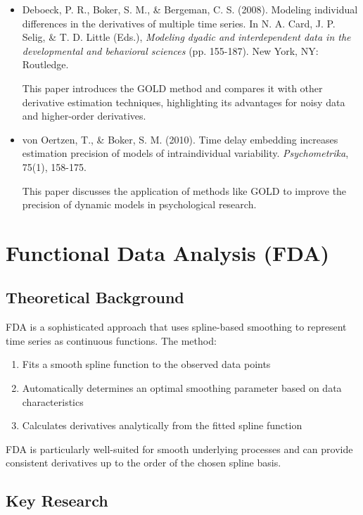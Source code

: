 \documentclass{article}
\begin{document}
\begin{itemize}
    \item Deboeck, P. R., Boker, S. M., \& Bergeman, C. S. (2008). Modeling individual differences in the derivatives of multiple time series. In N. A. Card, J. P. Selig, \& T. D. Little (Eds.), \textit{Modeling dyadic and interdependent data in the developmental and behavioral sciences} (pp. 155-187). New York, NY: Routledge.
    
    This paper introduces the GOLD method and compares it with other derivative estimation techniques, highlighting its advantages for noisy data and higher-order derivatives.
    
    \item von Oertzen, T., \& Boker, S. M. (2010). Time delay embedding increases estimation precision of models of intraindividual variability. \textit{Psychometrika}, 75(1), 158-175.
    
    This paper discusses the application of methods like GOLD to improve the precision of dynamic models in psychological research.
\end{itemize}

\section{Functional Data Analysis (FDA)}

\subsection{Theoretical Background}

FDA is a sophisticated approach that uses spline-based smoothing to represent time series as continuous functions. The method:

\begin{enumerate}
    \item Fits a smooth spline function to the observed data points
    \item Automatically determines an optimal smoothing parameter based on data characteristics
    \item Calculates derivatives analytically from the fitted spline function
\end{enumerate}

FDA is particularly well-suited for smooth underlying processes and can provide consistent derivatives up to the order of the chosen spline basis.

\subsection{Key Research}
\end{document}
